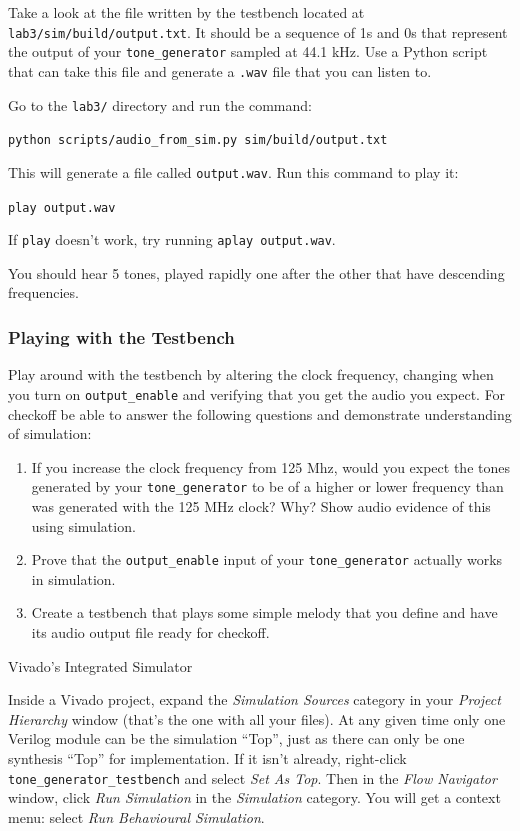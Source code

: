 \documentclass[11pt]{article}
\makeatletter
\renewcommand{\subsection}
{\@startsection {subsection}{1}{0pt}
 {-1ex}
 {0.5ex}
 {\bfseries\normalsize}}
\makeatother
\begin{document}
Take a look at the file written by the testbench located at \verb|lab3/sim/build/output.txt|. It should be a sequence of 1s and 0s that represent the output of your \verb|tone_generator| sampled at 44.1 kHz. Use a Python script that can take this file and generate a \verb|.wav| file that you can listen to.

Go to the \verb|lab3/| directory and run the command:

\verb|python scripts/audio_from_sim.py sim/build/output.txt|

This will generate a file called \verb|output.wav|. Run this command to play it:

\verb|play output.wav|

If \verb|play| doesn't work, try running \verb|aplay output.wav|.

You should hear 5 tones, played rapidly one after the other that have descending frequencies.

\subsubsection{Playing with the Testbench} \label{checkoff:0}

Play around with the testbench by altering the clock frequency, changing when you turn on \verb|output_enable| and verifying that you get the audio you expect. For checkoff be able to answer the following questions and demonstrate understanding of simulation:

\begin{enumerate}
	\item If you increase the clock frequency from 125 Mhz, would you expect the tones generated by your \verb|tone_generator| to be of a higher or lower frequency than was generated with the 125 MHz clock? Why? Show audio evidence of this using simulation.
	\item Prove that the \verb|output_enable| input of your \verb|tone_generator| actually works in simulation.
	\item Create a testbench that plays some simple melody that you define and have its audio output file ready for checkoff.
\end{enumerate}

\subsection{Vivado's Integrated Simulator}

Inside a Vivado project, expand the \emph{Simulation Sources} category in your \emph{Project Hierarchy} window (that's the one with all your files). At any given time only one Verilog module can be the simulation ``Top'', just as there can only be one synthesis ``Top'' for implementation. If it isn't already, right-click \verb|tone_generator_testbench| and select \emph{Set As Top}. Then in the \emph{Flow Navigator} window, click \emph{Run Simulation} in the \emph{Simulation} category. You will get a context menu: select \emph{Run Behavioural Simulation}.
\end{document}
